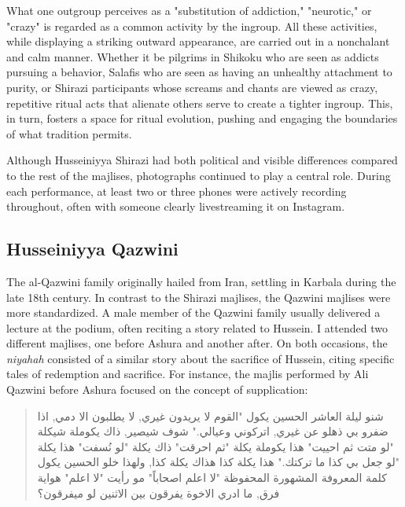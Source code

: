 What one outgroup perceives as a "substitution of addiction," "neurotic," or "crazy" is regarded as a common activity by the ingroup. All these activities, while displaying a striking outward appearance, are carried out in a nonchalant and calm manner. Whether it be pilgrims in Shikoku who are seen as addicts pursuing a behavior, Salafis who are seen as having an unhealthy attachment to purity, or Shirazi participants whose screams and chants are viewed as crazy, repetitive ritual acts that alienate others serve to create a tighter ingroup. This, in turn, fosters a space for ritual evolution, pushing and engaging the boundaries of what tradition permits.

Although Husseiniyya Shirazi had both political and visible differences compared to the rest of the majlises, photographs continued to play a central role. During each performance, at least two or three phones were actively recording throughout, often with someone clearly livestreaming it on Instagram.

\subsection{Husseiniyya Qazwini}
The al-Qazwini family originally hailed from Iran, settling in Karbala during the late 18th century. In contrast to the Shirazi majlises, the Qazwini majlises were more standardized. A male member of the Qazwini family usually delivered a lecture at the podium, often reciting a story related to Hussein. I attended two different majlises, one before Ashura and another after. On both occasions, the \emph{niyahah} consisted of a similar story about the sacrifice of Hussein, citing specific tales of redemption and sacrifice. For instance, the majlis performed by Ali Qazwini before Ashura focused on the concept of supplication:

\begin{quote}
\begin{Arabic}
شنو ليلة العاشر الحسين يكول "القوم لا يريدون غيري, لا يطلبون الا دمي, اذا ضفرو بي ذهلو عن غيري, اتركوني وعيالي." شوف شيصير, ذاك يكوملة شيكلة "لو متت ثم احييت" هذا يكوملة يكلة "ثم احرقت" ذاك يكلة "لو نُسفت" هذا يكلة "لو جعل بي كذا ما تركتك." هذا يكلة كذا هذاك يكلة كذا, ولهذا خلو الحسين يكول كلمة المعروفة المشهورة المحفوظة "لا اعلم اصحاباً" مو رأيت "لا اعلم" هواية فرق, ما ادري الاخوة يفرقون بين الاثنين لو ميفرقون؟
\end{Arabic}
\end{quote}

